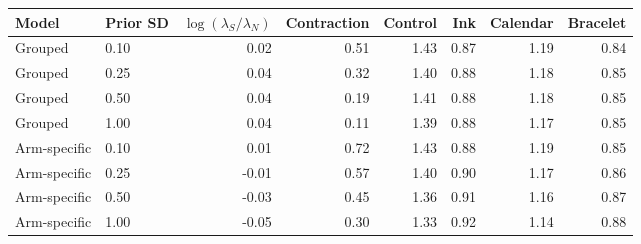 \begin{tabular}{llrrrrrr}
\toprule
Model & Prior SD & $\log(\lambda_S/\lambda_N)$ & Contraction & Control & Ink & Calendar & Bracelet \\
\midrule
Grouped & 0.10 & 0.02 & 0.51 & 1.43 & 0.87 & 1.19 & 0.84 \\
Grouped & 0.25 & 0.04 & 0.32 & 1.40 & 0.88 & 1.18 & 0.85 \\
Grouped & 0.50 & 0.04 & 0.19 & 1.41 & 0.88 & 1.18 & 0.85 \\
Grouped & 1.00 & 0.04 & 0.11 & 1.39 & 0.88 & 1.17 & 0.85 \\
Arm-specific & 0.10 & 0.01 & 0.72 & 1.43 & 0.88 & 1.19 & 0.85 \\
Arm-specific & 0.25 & -0.01 & 0.57 & 1.40 & 0.90 & 1.17 & 0.86 \\
Arm-specific & 0.50 & -0.03 & 0.45 & 1.36 & 0.91 & 1.16 & 0.87 \\
Arm-specific & 1.00 & -0.05 & 0.30 & 1.33 & 0.92 & 1.14 & 0.88 \\
\bottomrule
\end{tabular}
